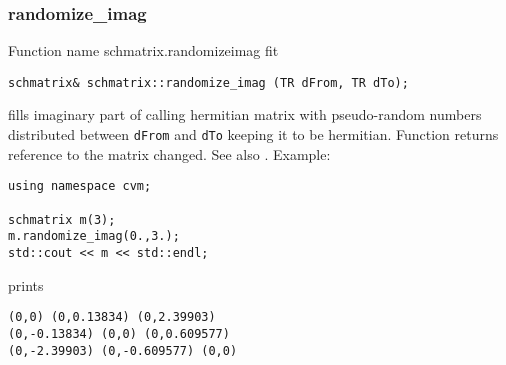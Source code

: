 \subsubsection{randomize\_imag}
Function%
\pdfdest name {schmatrix.randomizeimag} fit
\begin{verbatim}
schmatrix& schmatrix::randomize_imag (TR dFrom, TR dTo);
\end{verbatim}
fills  imaginary part of  calling hermitian matrix with 
pseudo-random numbers distributed between
\verb"dFrom" and \verb"dTo" keeping it to be hermitian.
Function
returns  reference to the matrix changed.
See also
.
Example:
\begin{Verbatim}
using namespace cvm;

schmatrix m(3);
m.randomize_imag(0.,3.);
std::cout << m << std::endl;
\end{Verbatim}
prints
\begin{Verbatim}
(0,0) (0,0.13834) (0,2.39903)
(0,-0.13834) (0,0) (0,0.609577)
(0,-2.39903) (0,-0.609577) (0,0)
\end{Verbatim}
\newpage

